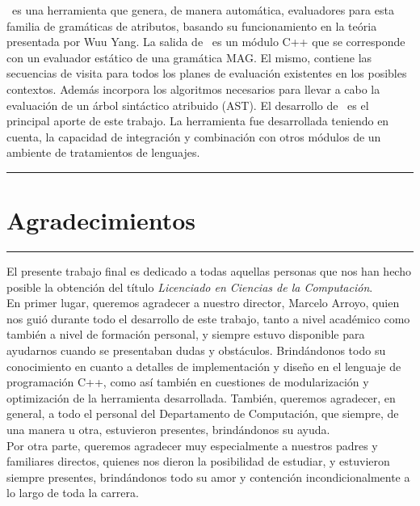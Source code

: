 \documentclass[a4paper,11pt]{ThesisStyle}
\begin{document}
\maggen\ es una herramienta que genera, de manera automática, evaluadores para esta familia de gramáticas de atributos, basando su funcionamiento en la teória presentada por Wuu Yang. La salida de \maggen\ es un módulo C++ que se corresponde con un evaluador estático de una gramática MAG. El mismo, contiene las secuencias de visita para todos los planes de evaluación existentes en los posibles contextos. Además incorpora los algoritmos necesarios para llevar a cabo la evaluación de un árbol sintáctico atribuido (AST).
El desarrollo de \maggen\ es el principal aporte de este trabajo. La herramienta fue desarrollada teniendo en cuenta, la capacidad de integración y combinación con otros módulos de un ambiente de tratamientos de lenguajes. 
\noindent\rule[2pt]{\textwidth}{0.5pt}
% 


\cleardoublepage

\chapter*{Agradecimientos}

\noindent\rule[2pt]{\textwidth}{0.5pt}

El presente trabajo final es dedicado a todas aquellas personas que nos han hecho posible la obtención del título \textit{Licenciado en Ciencias de la Computación}.\\

En primer lugar, queremos agradecer a nuestro director, Marcelo Arroyo, quien nos guió durante todo el desarrollo de este trabajo, tanto a nivel académico como también a nivel de formación personal, y siempre estuvo disponible para ayudarnos cuando se presentaban dudas y obstáculos. Brindándonos todo su conocimiento en cuanto a detalles de implementación y diseño en el lenguaje de programación C++, como así también en cuestiones de modularización y optimización de la herramienta desarrollada.
También, queremos agradecer, en general, a todo el personal del Departamento de Computación, que siempre, de una manera u otra, estuvieron presentes, brindándonos su ayuda.\\

Por otra parte, queremos agradecer muy especialmente a nuestros padres y familiares directos, quienes nos dieron la posibilidad de estudiar, y estuvieron siempre presentes, brindándonos todo su amor y contención incondicionalmente a lo largo de toda la carrera.\\ 
\end{document}

